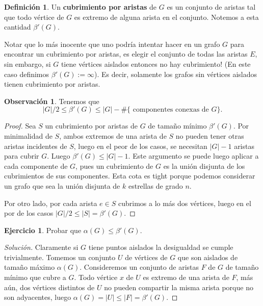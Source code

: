 \documentclass[12pt]{report}
\theoremstyle{plain}
\theoremstyle{definition}
\newtheorem{definition}[theorem]{Definición}
\newtheorem{obs}[theorem]{Observación}
\newtheorem{exercise}[theorem]{Ejercicio}
\newenvironment{solution}{\begin{proof}[Solución]}{\end{proof}}
\newcommand{\abs}[1]{\left \vert #1 \right \vert}
\begin{document}
\begin{definition}
Un \textbf{cubrimiento por aristas} de $G$ es un conjunto de aristas tal que todo vértice de $G$ es extremo de alguna arista en el conjunto. Notemos a esta cantidad $\beta ' (G)$.
\end{definition}
Notar que lo más inocente que uno podría intentar hacer en un grafo $G$ para encontrar un cubrimiento por aristas, es elegir el conjunto de todas las aristas $E$, sin embargo, si $G$ tiene vértices aislados entonces no hay cubrimiento! (En este caso definimos $\beta ' (G) := \infty$). Es decir, solamente los grafos sin vértices aislados tienen cubrimiento por aristas.

\begin{obs}
Tenemos que
\[
    \abs G / 2 \leq \beta ' (G) \leq \abs G - \#\{\text{ componentes conexas de $G$}\}.
\]
\end{obs}
\begin{proof}
Sea $S$ un cubrimiento por aristas de $G$ de tamaño mínimo $\beta ' (G)$. Por minimalidad de $S$, ambos extremos de una arista de $S$ no pueden tener otras aristas incidentes de $S$, luego en el peor de los casos, se necesitan $\abs G -1$ aristas para cubrir $G$. Luego $\beta ' (G) \leq \abs G -1$. Este argumento se puede luego aplicar a cada componente de $G$, pues un cubrimiento de $G$ es la unión disjunta de los cubrimientos de sus componentes. Esta cota es tight porque podemos considerar un grafo que sea la unión disjunta de $k$ estrellas de grado $n$.

Por otro lado, por cada arista $e \in S$ cubrimos a lo más dos vértices, luego en el por de los casos $\abs G / 2 \leq \abs S = \beta ' (G)$.
\end{proof}

\begin{exercise}
Probar que $\alpha (G) \leq \beta ' (G)$.
\end{exercise}
\begin{solution}
Claramente si $G$ tiene puntos aislados la desigualdad se cumple trivialmente. Tomemos un conjunto $U$ de vértices de $G$ que son aislados de tamaño máximo $\alpha (G)$. Consideremos un conjunto de aristas $F$ de $G$ de tamaño mínimo que cubre a $G$. Todo vértice $x$ de $U$ es extremo de una arista de $F$, más aún, dos vértices distintos de $U$ no pueden compartir la misma arista porque no son adyacentes, luego $\alpha (G) = \abs U \leq \abs F =  \beta ' (G)$.
\end{solution}
\end{document}
